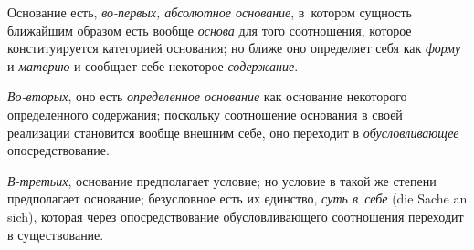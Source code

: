 Основание есть, {\em во-первых, абсолютное основание}, в~котором сущность
ближайшим образом есть вообще {\em основа} для того соотношения, которое
конституируется категорией основания; но ближе оно определяет себя как
{\em форму} и {\em материю} и сообщает себе некоторое {\em содержание}.

{\em Во-вторых}, оно есть {\em определенное основание} как основание некоторого
определенного содержания; поскольку соотношение основания в своей реализации
становится вообще внешним себе, оно переходит в {\em обусловливающее}
опосредствование.

{\em В-третьих}, основание предполагает условие; но условие в такой же степени
предполагает основание; безусловное есть их единство, {\em суть в~себе}
(die Sache an sich), которая через опосредствование обусловливающего
соотношения переходит в существование.


